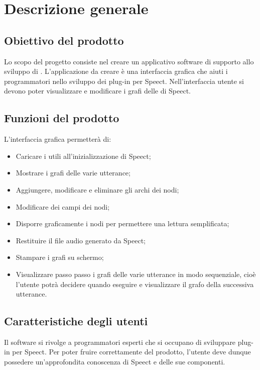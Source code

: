 \documentclass[../AnalisideiRequisiti.tex]{subfiles}
\begin{document}
	
\chapter{Descrizione generale}

\section{Obiettivo del prodotto}

Lo scopo del progetto consiste nel creare un applicativo software di supporto allo sviluppo di . L’applicazione da creare è una interfaccia grafica che aiuti i programmatori nello sviluppo dei plug-in per Speect. Nell’interfaccia utente si devono poter visualizzare e modificare i grafi delle  di Speect. 


\section{Funzioni del prodotto}
L’interfaccia grafica permetterà di:
\begin{itemize}
	\item{} Caricare i  utili all’inizializzazione di Speect;
	\item{} Mostrare i grafi delle varie utterance;
	\item{} Aggiungere, modificare e eliminare gli archi dei nodi;
	\item{} Modificare dei campi dei nodi;
	\item{} Disporre graficamente i nodi per permettere una lettura semplificata;
	\item{} Restituire il file audio generato da Speect;
	\item{} Stampare i grafi su schermo;
	\item{} Visualizzare passo passo i grafi delle varie utterance in modo sequenziale, cioè l’utente potrà decidere quando eseguire e visualizzare il grafo della successiva utterance.	
\end{itemize}


\section{Caratteristiche degli utenti}
Il software si rivolge a programmatori esperti che si occupano di sviluppare plug-in per Speect. Per poter fruire correttamente del prodotto, l'utente deve dunque possedere un'approfondita conoscenza di Speect e delle sue componenti.
\end{document}
